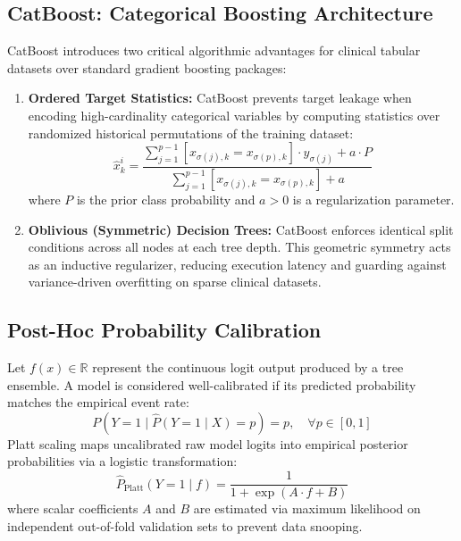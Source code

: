\documentclass[conference]{IEEEtran}
\begin{document}
\subsection{CatBoost: Categorical Boosting Architecture}
CatBoost \cite{prokhorenkova2018catboost} introduces two critical algorithmic advantages for clinical tabular datasets over standard gradient boosting packages:
\begin{enumerate}
    \item \textbf{Ordered Target Statistics:} CatBoost prevents target leakage when encoding high-cardinality categorical variables by computing statistics over randomized historical permutations of the training dataset:
    \begin{equation}
    \hat{x}_{k}^i = \frac{\sum_{j=1}^{p-1} [x_{\sigma(j), k} = x_{\sigma(p), k}] \cdot y_{\sigma(j)} + a \cdot P}{\sum_{j=1}^{p-1} [x_{\sigma(j), k} = x_{\sigma(p), k}] + a}
    \label{eq:ordered_ts}
    \end{equation}
    where $P$ is the prior class probability and $a > 0$ is a regularization parameter.
    \item \textbf{Oblivious (Symmetric) Decision Trees:} CatBoost enforces identical split conditions across all nodes at each tree depth. This geometric symmetry acts as an inductive regularizer, reducing execution latency and guarding against variance-driven overfitting on sparse clinical datasets.
\end{enumerate}

\subsection{Post-Hoc Probability Calibration}
Let $f(x) \in \mathbb{R}$ represent the continuous logit output produced by a tree ensemble. A model is considered well-calibrated if its predicted probability matches the empirical event rate:
\begin{equation}
P(Y = 1 \mid \hat{P}(Y = 1 \mid X) = p) = p, \quad \forall p \in [0, 1]
\label{eq:calibration_def}
\end{equation}
Platt scaling \cite{platt1999probabilistic} maps uncalibrated raw model logits into empirical posterior probabilities via a logistic transformation:
\begin{equation}
\hat{P}_{\text{Platt}}(Y = 1 \mid f) = \frac{1}{1 + \exp(A \cdot f + B)}
\label{eq:platt}
\end{equation}
where scalar coefficients $A$ and $B$ are estimated via maximum likelihood on independent out-of-fold validation sets to prevent data snooping.
\end{document}
